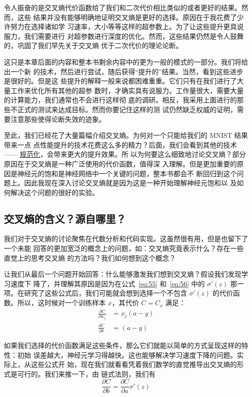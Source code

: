令人振奋的是交叉熵代价函数给了我们和二次代价相比类似的或者更好的结果。然而，这些
结果并没有能够明确地证明交叉熵是更好的选择。原因在于我花费了少许努力在选择诸如学
习速率，\minibatch{}大小等等这样的超参数上。为了让这些提升更具说服力，我们需要进行
对超参数进行深度的优化。然而，这些结果仍然是令人鼓舞的，巩固了我们早先关于交叉熵
优于二次代价的理论论断。

这只是本章后面的内容和整本书剩余内容中的更为一般的模式的一部分。我们将给出一个新
的技术，然后进行尝试，随后获得``提升的''结果。当然，看到这些进步是很好的。但是这
些提升的解释一般来说都困难重重。它们只有在我们进行了大量工作来优化所有其他的超参
数时，才确实具有说服力。工作量很大，需要大量的计算能力，我们通常也不会进行这样彻
底的调研。相反，我采用上面进行的那些不正式的测试来达成目标。然而你要记住这样的测
试仍然缺乏权威的证明，需要注意那些使得论断失效的迹象。

至此，我们已经花了大量篇幅介绍交叉熵。为何对一个只能给我们的 MNIST 结果带来一点
点性能提升的技术花费这么多的精力？后面，我们会看到其他的技术 ——
\hyperref[sec:overfitting_and_regularization]{规范化}，会带来更大的提升效果。所
以为何要这么细致地讨论交叉熵？部分原因在于交叉熵是一种广泛使用的代价函数，值得深
入理解。但是更加重要的原因是神经元的饱和是神经网络中一个关键的问题，整本书都会不
断回归到这个问题上。因此我现在深入讨论交叉熵就是因为这是一种开始理解神经元饱和以
及如何解决这个问题的很好的实验。

\subsection{交叉熵的含义？源自哪里？}

我们对于交叉熵的讨论聚焦在代数分析和代码实现。这虽然很有用，但是也留下了一个未能
回答的更加宽泛的概念上的问题，如：交叉熵究竟表示什么？存在一些直觉上的思考交叉熵
的方法吗？我们如何想到这个概念？

让我们从最后一个问题开始回答：什么能够激发我们想到交叉熵？假设我们发现学习速度下
降了，并理解其原因是因为在公式~\eqref{eq:55} 和~\eqref{eq:56} 中的 $\sigma'(z)$
那一项。在研究了这些公式后，我们可能就会想到选择一个不包含 $\sigma'(z)$ 的代价函
数。所以，这时候对一个训练样本 $x$，其代价 $C = C_x$ 满足：
\begin{align}
  \frac{\partial C}{\partial w_j} &= x_j(a-y) \label{eq:71}\tag{71}\\
  \frac{\partial C}{\partial b } &= (a-y) \label{eq:72}\tag{72}
\end{align}

如果我们选择的代价函数满足这些条件，那么它们就能以简单的方式呈现这样的特性：初始
误差越大，神经元学习得越快。这也能够解决学习速度下降的问题。实际上，从这些公式开
始，现在我们就看看凭着我们数学的直觉推导出交叉熵的形式是可行的。我们来推一下，由
链式法则，我们有
\begin{equation}
  \frac{\partial C}{\partial b} = \frac{\partial C}{\partial a}
  \sigma'(z)
  \tag{73}
\end{equation}

